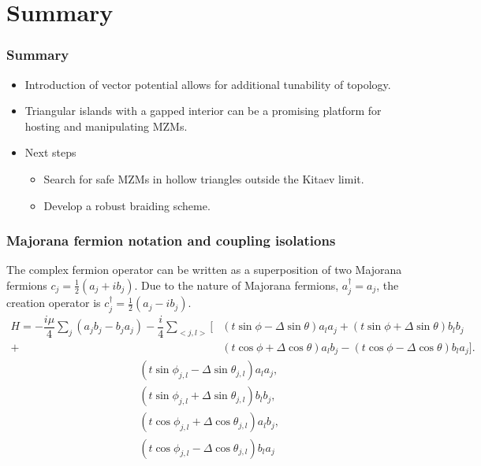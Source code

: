 \documentclass[xcolor=dvipsnames,10pt,aspectratio=169]{beamer}
\newcommand{\cc}{c^{\dagger}}
\newcommand{\de}{\Delta}
\newcommand{\CO}{Summary}
\begin{document}
  \section[Summary]{\CO}
  \begin{frame}
    \frametitle{\CO}

    \begin{itemize}
      \item Introduction of vector potential allows for additional tunability of topology.
      \item Triangular islands with a gapped interior can be a promising platform for hosting and manipulating MZMs.
      \item Next steps
        \begin{itemize}
          \item Search for safe MZMs in hollow triangles outside the Kitaev limit.
          \item Develop a robust braiding scheme.
        \end{itemize}
    \end{itemize}
  \end{frame}


  \appendix

  \begin{frame}
  \frametitle{Majorana fermion notation and coupling isolations}
    The complex fermion operator can be written as a superposition of two Majorana fermions $c_j = \frac{1}{2} (a_j + i b_j)$.
    Due to the nature of Majorana fermions, $a^{\dagger}_j = a_j$, the creation operator is $\cc_j = \frac{1}{2} (a_j - i b_j)$.
    \begin{align*}
      H = -\dfrac{i\mu}{4} \sum_j (a_j b_j - b_j a_j) - \dfrac{i}{4} \sum_{<j,l>} [&(t\sin\phi-\de\sin\theta) a_l a_j + (t\sin\phi+\de\sin\theta) b_l b_j \nonumber \\
      +&(t\cos\phi+\de\cos\theta) a_l b_j - (t\cos\phi-\de\cos\theta) b_l a_j].
    \end{align*}
    \begin{align}
      &(t \sin\phi_{j,l} - \de \sin\theta_{j,l}) a_l a_j, \\
      &(t \sin\phi_{j,l} + \de \sin\theta_{j,l}) b_l b_j, \\
      &(t \cos\phi_{j,l} + \de \cos\theta_{j,l}) a_l b_j, \\
      &(t \cos\phi_{j,l} - \de \cos\theta_{j,l}) b_l a_j
    \end{align}
  \end{frame}
\end{document}
